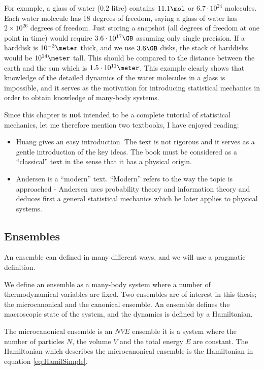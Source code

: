 For example, a glass of water ($0.2$ litre) contains $11.1 \mol$ or
$6.7\cdot 10^{24}$ molecules. Each water molecule has 18 degrees of
freedom, saying a glass of water has $2\times 10^{26}$ degrees of
freedom. Just storing a snapshot (all degrees of freedom at one
point in time) would require $3.6\cdot 10^{17} \GB$ assuming
only single precision. If a harddisk is $10^{-3} \meter$ thick,
and we use $3.6 \GB$ disks, the stack of harddisks would be $10^{14}
\meter$ tall. This should be compared to the distance between the earth
and the sun which is $1.5\cdot 10^{11} \meter$. This example clearly
shows that knowledge of the detailed dynamics of the water molecules in
a glass is impossible, and it serves as the motivation for introducing
statistical mechanics in order to obtain knowledge of many-body systems. 

Since this chapter is \textbf{not} intended to be a complete tutorial of
statistical mechanics, let me therefore mention two textbooks, I have
enjoyed reading:

\begin{itemize}
\item Huang \cite{Huang87} gives an easy introduction. The text is not
rigorous and it serves as a gentle introduction of the key ideas. The
book must be considered as a ``classical'' text in the sense that it
has a physical origin.

\item Andersen \cite{Andersen} is a ``modern'' text. ``Modern'' refers
to the way the topic is approached - Andersen uses probability theory
and information theory and deduces first a general statistical
mechanics which he later applies to physical systems. 
\end{itemize}

\subsection{Ensembles}
\label{sect:Ensembles}
An ensemble can defined in many different ways, and we will use a
pragmatic definition. 

We define an ensemble as a many-body system where a number of
thermodynamical variables are fixed. Two ensembles are of interest
in this thesis; the microcanonical and the canonical ensemble. An
ensemble defines the macroscopic state of the system, and the dynamics
is defined by a Hamiltonian.

The microcanonical ensemble is an $NVE$ ensemble \ie it is a system
where the number of particles $N$, the volume $V$ and the total energy
$E$ are constant. The Hamiltonian which describes the microcanonical
ensemble is the Hamiltonian in equation \eqref{eq:HamilSimple}.

